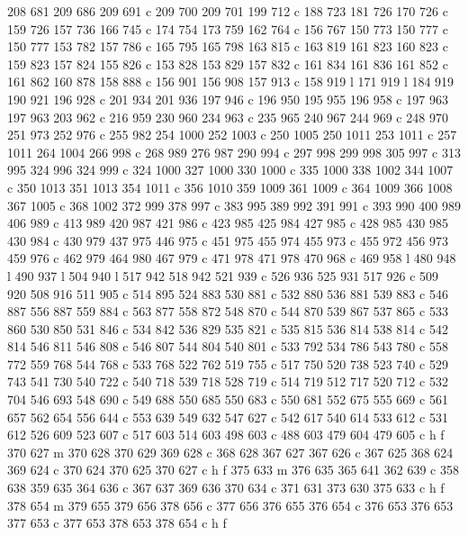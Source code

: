 {{   208 681 209 686 209 691 c
   209 700 209 701 199 712 c
   188 723 181 726 170 726 c
   159 726 157 736 166 745 c
   174 754 173 759 162 764 c
   156 767 150 773 150 777 c
   150 777 153 782 157 786 c
   165 795 165 798 163 815 c
   163 819 161 823 160 823 c
   159 823 157 824 155 826 c
   153 828 153 829 157 832 c
   161 834 161 836 161 852 c
   161 862 160 878 158 888 c
   156 901 156 908 157 913 c
   158 919 l
   171 919 l
   184 919 190 921 196 928 c
   201 934 201 936 197 946 c
   196 950 195 955 196 958 c
   197 963 197 963 203 962 c
   216 959 230 960 234 963 c
   235 965 240 967 244 969 c
   248 970 251 973 252 976 c
   255 982 254 1000 252 1003 c
   250 1005 250 1011 253 1011 c
   257 1011 264 1004 266 998 c
   268 989 276 987 290 994 c
   297 998 299 998 305 997 c
   313 995 324 996 324 999 c
   324 1000 327 1000 330 1000 c
   335 1000 338 1002 344 1007 c
   350 1013 351 1013 354 1011 c
   356 1010 359 1009 361 1009 c
   364 1009 366 1008 367 1005 c
   368 1002 372 999 378 997 c
   383 995 389 992 391 991 c
   393 990 400 989 406 989 c
   413 989 420 987 421 986 c
   423 985 425 984 427 985 c
   428 985 430 985 430 984 c
   430 979 437 975 446 975 c
   451 975 455 974 455 973 c
   455 972 456 973 459 976 c
   462 979 464 980 467 979 c
   471 978 471 978 470 968 c
   469 958 l
   480 948 l
   490 937 l
   504 940 l
   517 942 518 942 521 939 c
   526 936 525 931 517 926 c
   509 920 508 916 511 905 c
   514 895 524 883 530 881 c
   532 880 536 881 539 883 c
   546 887 556 887 559 884 c
   563 877 558 872 548 870 c
   544 870 539 867 537 865 c
   533 860 530 850 531 846 c
   534 842 536 829 535 821 c
   535 815 536 814 538 814 c
   542 814 546 811 546 808 c
   546 807 544 804 540 801 c
   533 792 534 786 543 780 c
   558 772 559 768 544 768 c
   533 768 522 762 519 755 c
   517 750 520 738 523 740 c
   529 743 541 730 540 722 c
   540 718 539 718 528 719 c
   514 719 512 717 520 712 c
   532 704 546 693 548 690 c
   549 688 550 685 550 683 c
   550 681 552 675 555 669 c
   561 657 562 654 556 644 c
   553 639 549 632 547 627 c
   542 617 540 614 533 612 c
   531 612 526 609 523 607 c
   517 603 514 603 498 603 c
   488 603 479 604 479 605 c
   h f
   370 627 m
   370 628 370 629 369 628 c
   368 628 367 627 367 626 c
   367 625 368 624 369 624 c
   370 624 370 625 370 627 c
   h f
   375 633 m
   376 635 365 641 362 639 c
   358 638 359 635 364 636 c
   367 637 369 636 370 634 c
   371 631 373 630 375 633 c
   h f
   378 654 m
   379 655 379 656 378 656 c
   377 656 376 655 376 654 c
   376 653 376 653 377 653 c
   377 653 378 653 378 654 c
   h f
}}
